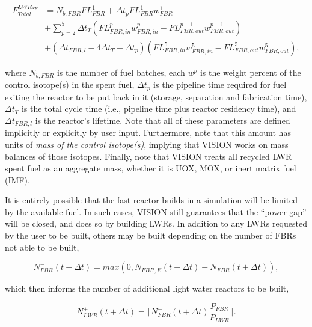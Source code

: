 \begin{equation}
\begin{aligned}
F^{LWR_{SF}}_{Total} & = N_{b,FBR} FL^1_{FBR} + \Delta t_p FL^1_{FBR} w^1_{FBR} \\
                   & + \sum_{p=2}^{5} \Delta t_T (FL^p_{FBR,in} w^p_{FBR,in} - FL^{p-1}_{FBR,out} w^{p-1}_{FBR,out}) \\
                   & + (\Delta t_{FBR,l} - 4 \Delta t_T - \Delta t_p) (FL^5_{FBR,in} w^5_{FBR,in} - FL^{5}_{FBR,out} w^{5}_{FBR,out}),
\end{aligned}
\end{equation}

where $N_{b,FBR}$ is the number of fuel batches, each $w^p$ is the weight
percent of the control isotope(s) in the spent fuel, $\Delta t_p$ is the
pipeline time required for fuel exiting the reactor to be put back in it
(storage, separation and fabrication time), $\Delta t_T$ is the total cycle time
(i.e., pipeline time plus reactor residency time), and $\Delta t_{FBR,l}$ is the
reactor's lifetime. Note that all of these parameters are defined implicitly or
explicitly by user input. Furthermore, note that this amount has units
of \textit{mass of the control isotope(s)}, implying that VISION works on mass
balances of those isotopes. Finally, note that VISION treats all recycled LWR
spent fuel as an aggregate mass, whether it is UOX, MOX, or inert matrix fuel
(IMF).

It is entirely possible that the fast reactor builds in a simulation will be
limited by the available fuel. In such cases, VISION still guarantees that the
``power gap'' will be closed, and does so by building LWRs. In addition to any
LWRs requested by the user to be built, others may be built depending on the
number of FBRs not able to be built,

\begin{equation}
N^-_{FBR}\left(t+\Delta t\right) = 
                        max(0,N_{FBR,E}\left(t+\Delta t\right) - 
                        N_{FBR}\left(t+\Delta t\right)),
\end{equation}

which then informs the number of additional light water reactors to be built,

\begin{equation}
N^+_{LWR}\left(t+\Delta t\right) = \lceil N^-_{FBR}\left(t+\Delta t\right) 
                        \frac{P_{FBR}}{P_{LWR}} \rceil .
\end{equation}

